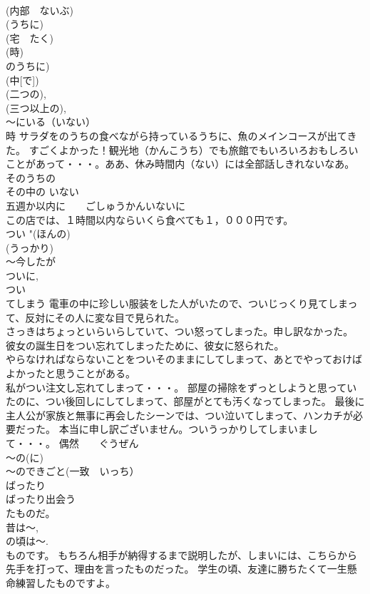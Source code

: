\documentclass[8pt]{extreport}
\begin{document}
\begin{CJK}{UTF8}{min}
\\	(内部　ないぶ) 
\\	(うちに) 
\\	(宅　たく) 
\\	(時) 
\\	のうちに) 
\\	(中[で]) 
\\	(二つの), 
\\	(三つ以上の), 
\\	～にいる（いない） 
\\	時 サラダをのうちの食べながら持っているうちに、魚のメインコースが出てきた。 すごくよかった！観光地（かんこうち）でも旅館でもいろいろおもしろいことがあって・・・。ああ、休み時間内（ない）には全部話しきれないなあ。 そのうちの 
\\	その中の いない 
\\	五週か以内に　　ごしゅうかんいないに 
\\	この店では、１時間以内ならいくら食べても１，０００円です。 
\\	つい	"(ほんの) 
\\	(うっかり) 
\\	～今したが　
\\	ついに, 
\\	つい 
\\	てしまう 電車の中に珍しい服装をした人がいたので、ついじっくり見てしまって、反対にその人に変な目で見られた。 
\\	さっきはちょっといらいらしていて、つい怒ってしまった。申し訳なかった。 
\\	彼女の誕生日をつい忘れてしまったために、彼女に怒られた。 
\\	やらなければならないことをついそのままにしてしまって、あとでやっておけばよかったと思うことがある。 
\\	私がつい注文し忘れてしまって・・・。 部屋の掃除をずっとしようと思っていたのに、つい後回しにしてしまって、部屋がとても汚くなってしまった。 最後に主人公が家族と無事に再会したシーンでは、つい泣いてしまって、ハンカチが必要だった。 本当に申し訳ございません。ついうっかりしてしまいまして・・・。 偶然　　ぐうぜん 
\\	～の(に) 
\\	～のできごと(一致　いっち）　
\\	ばったり 
\\	ばったり出会う
\\	たものだ。	
\\	昔は～, 
\\	の頃は～. 
\\	ものです。 もちろん相手が納得するまで説明したが、しまいには、こちらから先手を打って、理由を言ったものだった。 学生の頃、友達に勝ちたくて一生懸命練習したものですよ。 

\end{CJK}
\end{document}
